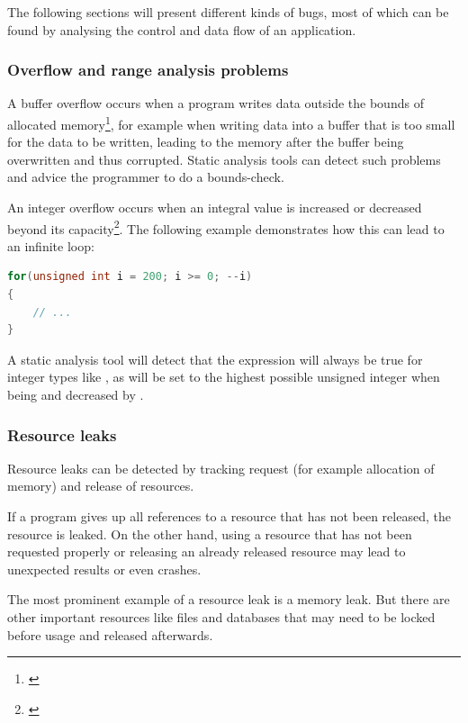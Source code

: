 The following sections will present different kinds of bugs, most of which can be found by analysing the control and data flow of an application.

\subsubsection{Overflow and range analysis problems}

A buffer overflow occurs when a program writes data outside the bounds of allocated memory\footnote{\citep[175]{SecureProgramming}}, for example when writing data into a buffer that is too small for the data to be written, leading to the memory after the buffer being overwritten and thus corrupted. Static analysis tools can detect such problems and advice the programmer to do a bounds-check.

An integer overflow occurs when an integral value is increased or decreased beyond its capacity\footnote{\citep[235]{SecureProgramming}}. The following example demonstrates how this can lead to an infinite loop:

\SingleSpacing
\begin{lstlisting}[language=C++, caption=Integer \mySlang{underflow} in \myProperName{C++}]
for(unsigned int i = 200; i >= 0; --i)
{
	// ...
}
\end{lstlisting}
\OnehalfSpacing

A static analysis tool will detect that the expression  will always be true for  integer types like , as  will be set to the highest possible unsigned integer when being  and decreased by .

\subsubsection{Resource leaks}

Resource leaks can be detected by tracking request (for example allocation of memory) and release of resources.

If a program gives up all references to a resource that has not been released, the resource is leaked. On the other hand, using a resource that has not been requested properly or releasing an already released resource may lead to unexpected results or even crashes.

The most prominent example of a resource leak is a memory leak. But there are other important resources like files and databases that may need to be locked before usage and released afterwards.

